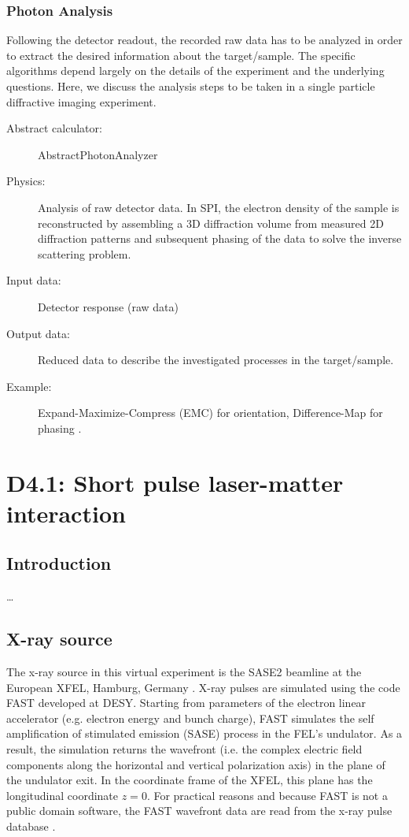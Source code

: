 \documentclass[a4paper]{article}
\begin{document}
\subsubsection{Photon Analysis}
Following the detector readout, the recorded raw data has to be analyzed in order to extract the desired information about the target/sample. The
specific algorithms depend largely on the details of the experiment and the underlying questions. Here, we discuss the analysis steps to be taken
in a single particle diffractive imaging experiment.
\begin{description}
  \item[Abstract calculator:] AbstractPhotonAnalyzer
  \item[Physics:]  Analysis of raw detector data. In SPI, the electron density of the sample is reconstructed by assembling a 3D diffraction volume
    from measured 2D diffraction patterns and subsequent phasing of the data to solve the inverse scattering problem.
  \item[Input data:] Detector response (raw data)
  \item[Output data:] Reduced data to describe the investigated processes in the target/sample.
  \item[Example:]  Expand-Maximize-Compress (EMC)  for orientation, Difference-Map for phasing \cite{Loh2009, s2e_recon_bitbucket}.
\end{description}

\section{D4.1: Short pulse laser-matter interaction\label{sec:short_pulse}}
%
\subsection{Introduction}
\ldots{}
%
\subsection{X-ray source}
The x-ray source in this virtual experiment is the SASE2 beamline at the European XFEL, Hamburg, Germany \cite{Tschentscher2011}.
X-ray pulses are simulated using the code FAST \cite{Saldin1999} developed at DESY. Starting from parameters of the electron linear accelerator
(e.g. electron energy and bunch charge), FAST simulates the self amplification of stimulated emission (SASE) process \cite{} in the FEL's
undulator. As a result, the simulation returns the wavefront (i.e. the complex electric field components
along the horizontal and vertical polarization axis) in the plane of the undulator exit. In the coordinate frame of the
XFEL, this plane has the longitudinal coordinate $z=0$. For practical reasons and because FAST is not a public domain software,
the FAST wavefront data are read from the x-ray pulse database \cite{xpd_xfel}.
\end{document}

